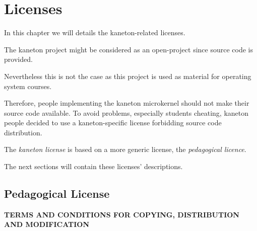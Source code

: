 %
%
%
%
%
%

%
%

\chapter{Licenses}
\label{chapter:licenses}

In this chapter we will details the kaneton-related licenses.

\newpage

%
%

The kaneton project might be considered as an open-project since source
code is provided.

Nevertheless this is not the case as this project is used as material for
operating system courses.

Therefore, people implementing the kaneton microkernel should not
make their source code available. To avoid problems, especially students
cheating, kaneton people decided to use a kaneton-specific license
forbidding source code distribution.

The \textit{kaneton license} is based on a more generic license, the
\textit{pedagogical licence}.

The next sections will contain these licenses' descriptions.

%
%

\section{Pedagogical License}

\textbf{TERMS AND CONDITIONS FOR COPYING, DISTRIBUTION AND MODIFICATION}

